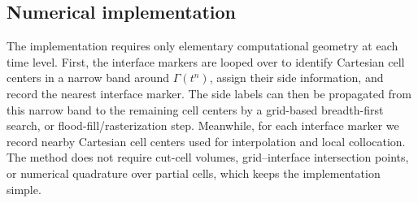 \documentclass[11pt,reqno]{amsart}
\theoremstyle{plain}
\theoremstyle{definition}
\numberwithin{equation}{section}
\begin{document}
\subsection{Numerical implementation}

The implementation requires only elementary computational geometry at each time
level. First, the interface markers are looped over to identify Cartesian
cell centers in a narrow band around $\Gamma(t^n)$, assign their side
information, and record the nearest interface marker. The side labels can then
be propagated from this narrow band to the remaining cell centers by a
grid-based breadth-first search, or flood-fill/rasterization step. Meanwhile,
for each interface marker we record nearby Cartesian cell centers used for
interpolation and local collocation. The method does not require cut-cell
volumes, grid--interface intersection points, or numerical quadrature over
partial cells, which keeps the implementation simple.
\end{document}
